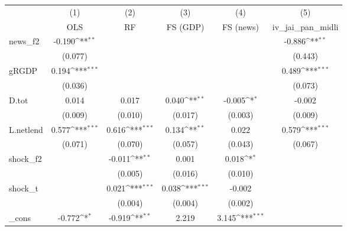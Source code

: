 {
\def\sym#1{\ifmmode^{#1}\else\(^{#1}\)\fi}
\begin{tabular}{l*{5}{c}}
\toprule
            &\multicolumn{1}{c}{(1)}&\multicolumn{1}{c}{(2)}&\multicolumn{1}{c}{(3)}&\multicolumn{1}{c}{(4)}&\multicolumn{1}{c}{(5)}\\
            &\multicolumn{1}{c}{OLS}&\multicolumn{1}{c}{RF}&\multicolumn{1}{c}{FS (GDP)}&\multicolumn{1}{c}{FS (news)}&\multicolumn{1}{c}{iv\_jai\_pan\_midli}\\
\midrule
news\_f2     &      -0.190\sym{**} &                     &                     &                     &      -0.886\sym{**} \\
            &     (0.077)         &                     &                     &                     &     (0.443)         \\
\addlinespace
gRGDP       &       0.194\sym{***}&                     &                     &                     &       0.489\sym{***}\\
            &     (0.036)         &                     &                     &                     &     (0.073)         \\
\addlinespace
D.tot       &       0.014         &       0.017         &       0.040\sym{**} &      -0.005\sym{*}  &      -0.002         \\
            &     (0.009)         &     (0.010)         &     (0.017)         &     (0.003)         &     (0.009)         \\
\addlinespace
L.netlend   &       0.577\sym{***}&       0.616\sym{***}&       0.134\sym{**} &       0.022         &       0.579\sym{***}\\
            &     (0.071)         &     (0.070)         &     (0.057)         &     (0.043)         &     (0.067)         \\
\addlinespace
shock\_f2    &                     &      -0.011\sym{**} &       0.001         &       0.018\sym{*}  &                     \\
            &                     &     (0.005)         &     (0.016)         &     (0.010)         &                     \\
\addlinespace
shock\_t     &                     &       0.021\sym{***}&       0.038\sym{***}&      -0.002         &                     \\
            &                     &     (0.004)         &     (0.004)         &     (0.002)         &                     \\
\addlinespace
\_cons      &      -0.772\sym{*}  &      -0.919\sym{**} &       2.219         &       3.145\sym{***}&                     \\

\end{tabular}}

